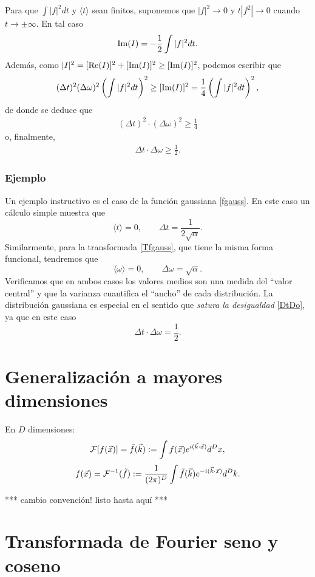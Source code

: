 Para que $\int |f|^2 dt$ y $\langle t \rangle$ sean finitos, suponemos que $|f|^2\rightarrow 0$ y $t|f^2| \rightarrow 0$ cuando $t \rightarrow \pm \infty$. En tal caso
\begin{align}
{\rm Im}(I)=-\frac{1}{2}\int |f|^2 dt.
\end{align}
Además, como $|I|^2=[{\rm Re}(I)]^2+[{\rm Im}(I)]^2\geq [{\rm Im}(I)]^2$, podemos escribir que
\begin{align}
(\Delta t)^2 (\Delta \omega)^2 \left(\int |f|^2 dt \right)^2 \geq [{\rm Im}(I)]^2= \frac{1}{4} \left( \int |f|^2 dt\right)^2,
\end{align}
de donde se deduce que
\begin{align}
(\Delta t)^2 \cdot (\Delta\omega)^2 \geq \frac{1}{4}
\end{align}
o, finalmente,
\begin{align}\label{DtDo}
\boxed{
\Delta t\cdot \Delta\omega\ge\frac{1}{2}.
}
\end{align}

\subsubsection{Ejemplo}
Un ejemplo instructivo es el caso de la función gaussiana \eqref{fgauss}. En este caso un cálculo simple muestra que
\begin{equation}
\langle t\rangle=0,  \qquad \Delta t =\frac{1}{2\sqrt{\alpha}}.
\end{equation}
Similarmente, para la transformada \eqref{Tfgauss}, que tiene la misma forma funcional, tendremos que
\begin{equation}
\langle\omega\rangle=0,  \qquad \Delta\omega =\sqrt{\alpha}.
\end{equation}
Verificamos que en ambos casos los valores medios son una medida del ``valor central'' y que la varianza cuantifica el ``ancho'' de cada distribución. La distribución gaussiana es especial en el sentido que \textit{satura la desigualdad} \eqref{DtDo}, ya que en este caso
\begin{equation}
\Delta t\cdot \Delta\omega =\frac{1}{2}.
\end{equation}
\section{Generalización a mayores dimensiones}
En $D$ dimensiones:
\begin{equation}
{\cal F}[f(\vec{x})]=\tilde{f}(\vec{k})
:= \int f(\vec{x})e^{i(\vec{k}\cdot\vec{x})}d^Dx,
\end{equation}
\begin{equation}
f(\vec{x}) = {\cal F}^{-1}(\tilde{f})
:= \frac{1}{(2\pi)^{D}}\int \tilde{f}(\vec{k})e^{-i(\vec{k}\cdot\vec{x})}d^Dk.
\end{equation}

*** cambio convención! listo hasta aquí ***


\section{Transformada de Fourier seno y coseno}










